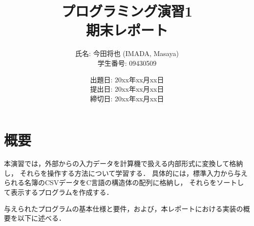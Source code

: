 \documentclass[a4j,11pt]{jarticle}
\title{プログラミング演習1 \\
       期末レポート}
\author{氏名: 今田将也 (IMADA, Masaya) \\
        学生番号: 09430509}
\date{出題日: 20xx年xx月xx日 \\
      提出日: 20xx年xx月xx日 \\
      締切日: 20xx年xx月xx日 \\}  %
\begin{document}
\maketitle



\section{概要}


本演習では，外部からの入力データを計算機で扱える内部形式に変換して格納し，
それらを操作する方法について学習する．
具体的には，標準入力から与えられる名簿のCSVデータをC言語の構造体の配列に格納し，
それらをソートして表示するプログラムを作成する．

与えられたプログラムの基本仕様と要件，および，本レポートにおける実装の概要を以下に述べる．
\end{document}
